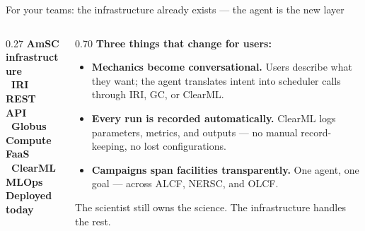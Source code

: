 \documentclass[aspectratio=169,11pt]{beamer}
\begin{document}
\begin{frame}{For your teams: the infrastructure already exists — the agent is the new layer}
  \begin{columns}[c]
    \begin{column}{0.27\textwidth}
      \centering
      \small\bfseries\color{labnavy}AmSC infrastructure\\[8pt]
      {\color{accentblue}\faPlug\ \textbf{IRI}}\\
      {\scriptsize\normalfont REST API}\\[6pt]
      {\color{accentteal}\faGlobe\ \textbf{Globus Compute}}\\
      {\scriptsize\normalfont FaaS}\\[6pt]
      {\color{accentgold}\faCogs\ \textbf{ClearML}}\\
      {\scriptsize\normalfont MLOps}\\[8pt]
      {\scriptsize\color{midgray}\normalfont Deployed today}
    \end{column}
    \begin{column}{0.70\textwidth}
      \small
      {\bfseries\color{labnavy} Three things that change for users:}\\[6pt]
      \begin{itemize}\setlength\itemsep{5pt}
        \item[\faArrowRight] \textbf{Mechanics become conversational.}
          Users describe what they want; the agent translates intent into
          scheduler calls through IRI, GC, or ClearML.
        \item[\faArrowRight] \textbf{Every run is recorded automatically.}
          ClearML logs parameters, metrics, and outputs — no manual
          record-keeping, no lost configurations.
        \item[\faArrowRight] \textbf{Campaigns span facilities transparently.}
          One agent, one goal — across ALCF, NERSC, and OLCF.
      \end{itemize}
      \vspace{4pt}
      {\footnotesize\color{midgray}
        The scientist still owns the science. The infrastructure handles the rest.}
    \end{column}
  \end{columns}
\end{frame}
\end{document}
